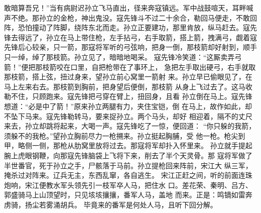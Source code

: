 敢暗算吾兄！”当有病尉迟孙立飞马直出，径来奔寇镇远。军中战鼓喧天，耳畔喊
声不绝。那孙立的金枪，神出鬼没。寇先锋斗不过二十余合，勒回马便走，不敢回
阵，恐怕撞动了阵脚，绕阵东北而走。孙立正要建功，那里肯放，纵马赶去。寇先
锋去得远了，孙立在马上带住枪，左手拈弓，右手取箭，搭上箭，拽满弓，觑着寇
先锋后心较亲，只一箭，那寇将军听的弓弦响，把身一倒，那枝箭却好射到，顺手
只一绰，绰了那枝箭。孙立见了，暗暗地喝采。
寇先锋冷笑道：“这厮卖弄弓箭！”便把那枝箭咬在口里，自把枪带在了事环上，
急把左手取出硬弓，右手就取那枝箭，搭上弦，扭过身来，望孙立前心窝里一箭射
来。孙立早已偷眼见了，在马上左来右去。那枝箭到胸前，把身望后便倒，那枝箭
从身上飞过去了。这马收勒不住，只顾跑来。寇先锋把弓穿在臂上，扭回身，且看
孙立倒在马上。寇先锋想道：“必是中了箭！”原来孙立两腿有力，夹住宝铠，倒
在马上，故作如此，却不坠下马来。寇先锋勒转马，要来捉孙立。两个马头，却好
相迎着，隔不的丈尺来去，孙立却跳将起来，大喝一声。寇先锋吃了一惊，便回道：
“你只躲的我箭，须躲不的我枪。”望孙立胸前尽力一枪搠来。孙立挺起胸脯，受
他一枪。枪尖到甲，略侧一侧，那枪从肋窝里放将过去。那寇将军却扑入怀里来。
孙立就手提起腕上虎眼钢鞭，向那寇先锋脑袋上飞将下来，削去了半个天灵骨。那
寇将军做了半世番官，死于孙立之手，尸骸落于马前。孙立提枪回来阵前，宋江大
纵三军，掩杀过对阵来。辽兵无主，东西乱窜，各自逃生。
宋江正赶之间，听的前面连珠炮响，宋江便教水军头领先引一枝军卒人马，把住水
口。差花荣、秦明、吕方、郭盛骑马上山顶望时，只见垓垓攘攘，番军人马，盖地
而来。正是：鸣镝如雷奔虏骑，扬尘若雾涌胡兵。
毕竟来的番军是何处人马，且听下回分解。